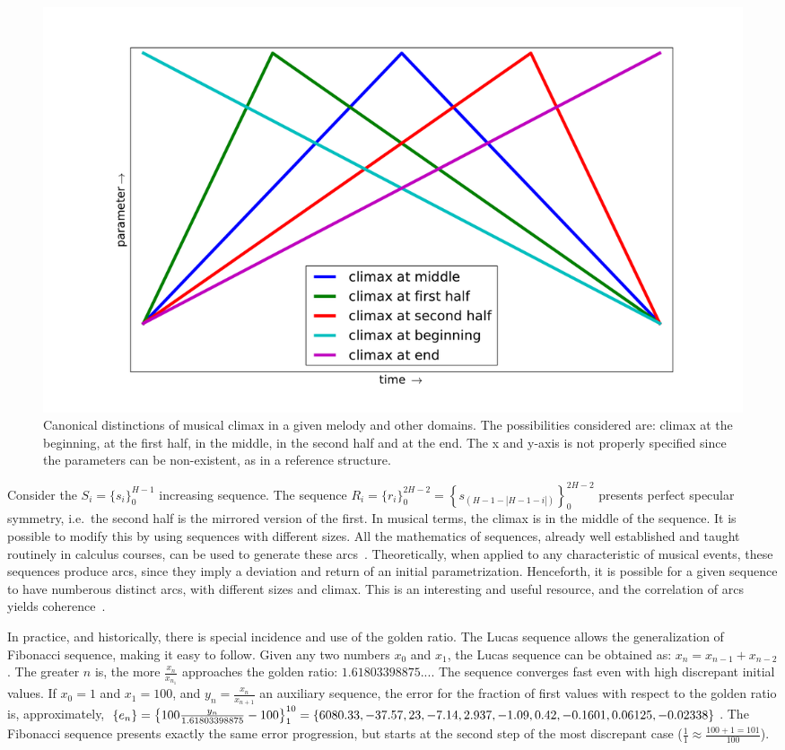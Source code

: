 \begin{figure}
    \centering
        \includegraphics[width=\columnwidth]{figures/climax}
        \caption{Canonical distinctions of musical climax in a given melody and
        other domains. The possibilities considered are: climax at the beginning, at the first half, in the middle, in the second half and 
        at the end. The x and y-axis is not properly specified since the parameters can be non-existent, as in a reference structure.}
        \label{fig:climax}
\end{figure}

Consider the $S_i=\{s_i\}_0^{H-1}$ increasing sequence. The sequence
$R_i=\{r_i\}_0^{2H -2}=\left\{s_{(H-1-|H-1-i|)}\right\}_0^{2H-2}$
presents perfect specular symmetry, i.e.\ the second half is the
mirrored version of the first. In musical terms, the climax is
in the middle of the sequence. It is possible to modify this
by using sequences with different sizes. All the mathematics of
sequences, already well established and taught routinely in calculus courses, can be used to generate these arcs~\cite{Guidorizzo,Schoenberg}. 
Theoretically, when applied to any characteristic of musical events, 
these sequences produce arcs, since they imply a deviation and return of an initial parametrization.
Henceforth, it is possible for a given sequence to have
numberous distinct arcs, with different sizes and climax. 
This is an interesting and useful resource, and the correlation of arcs yields coherence~\cite{Salzer}.

In practice, and historically, there is special incidence and use of the golden ratio. The Lucas sequence allows the generalization of
Fibonacci sequence, making it easy to follow. Given any two numbers $x_0$
and $x_1$, the Lucas sequence can be obtained as: $x_n=x_{n-1}+x_{n-2}$. The greater $n$ is, the more $\frac{x_{n}}{x_{n_1}}$ approaches the golden ratio:
$1.61803398875...$. The sequence converges fast even with high discrepant
initial values. If $x_0=1$ and $x_1=100$, and $y_n=\frac{x_n}{x_{n+1}}$ an
auxiliary sequence, the error for the fraction of first values with
respect to the golden ratio is, approximately, $\{ e_n \}
=\left\{100\frac{y_n}{1.61803398875}-100 \right\}_1^{10}=\{6080.33, -37.57, 23,
-7.14, 2.937, -1.09, 0.42, -0.1601, \\ 0.06125, -0.02338\}$. The Fibonacci sequence
presents exactly the same error progression, but starts at the second step of the most discrepant
case ($\frac{1}{1}\approx\frac{100+1 = 101}{100}$).

